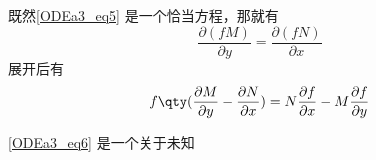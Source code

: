 既然\autoref{ODEa3_eq5} 是一个恰当方程，那就有
\begin{equation}
\frac{\partial (fM)}{\partial y}=\frac{\partial (fN)}{\partial x}
\end{equation}
展开后有
\begin{equation}\label{ODEa3_eq6}
f\qty(\frac{\partial M}{\partial y}-\frac{\partial N}{\partial x})=N\frac{\partial f}{\partial x}-M\frac{\partial f}{\partial y}
\end{equation}

\autoref{ODEa3_eq6} 是一个关于未知


















